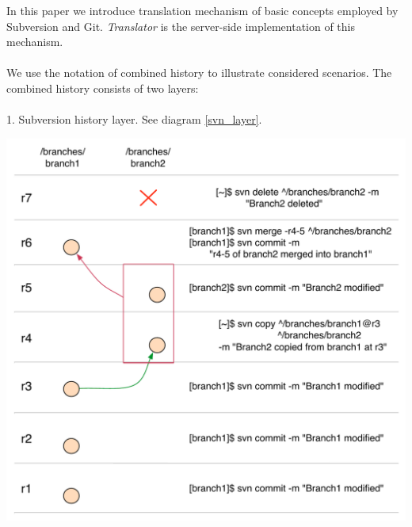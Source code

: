 \renewcommand{\figurename}{Diagram}
In this paper we introduce translation mechanism of basic concepts employed by Subversion and Git. \emph{Translator} is the server-side implementation of this mechanism.
\\\\
We use the notation of combined history to illustrate considered scenarios. The combined history consists of two layers:
\\\\
1. Subversion history layer. See diagram \ref{svn_layer}.
\begin{center}
\includegraphics[width=\textwidth]{img/legend/svn_layer.pdf}%
\label{svn_layer}%
\end{center}

